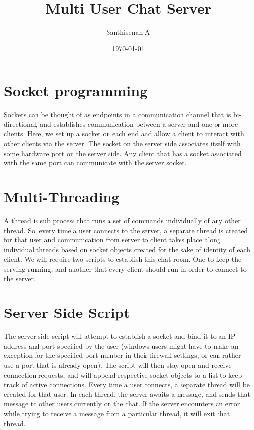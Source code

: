 \documentclass[a4paper,12pt]{article}
\begin{document}
    
\title{Multi User Chat Server}
\author{Santhisenan A}
\date{\today}
\maketitle
    
\section{Socket programming}
    
Sockets can be thought of as endpoints in a communication channel that is 
bi-directional, and establishes communication between a server and one or 
more clients. Here, we set up a socket on each end and allow a client to interact 
with other clients via the server. The socket on the server side associates itself 
with some hardware port on the server side. Any client that has a socket associated
with the same port can communicate with the server socket.
    
\section{Multi-Threading}



A thread is sub process that runs a set of commands individually of any other thread.
So, every time a user connects to the server, a separate thread is created for that user
and communication from server to client takes place along individual threads based on
socket objects created for the sake of identity of each client.
We will require two scripts to establish this chat room. One to keep the serving running,
and another that every client should run in order to connect to the server.

\section{Server Side Script}
The server side script will attempt to establish a socket and bind it to an IP address and port specified by the user (windows users might have to make an exception for the specified port number in their firewall settings, or can rather use a port that is already open). The script will then stay open and receive connection requests, and will append respective socket objects to a list to keep track of active connections. Every time a user connects,
a separate thread will be created for that user. In each thread, the server awaits a message, and sends that message to other users currently on the chat. If the server encounters an error while trying to receive a message from a particular thread, it will exit that thread.
\end{document}
